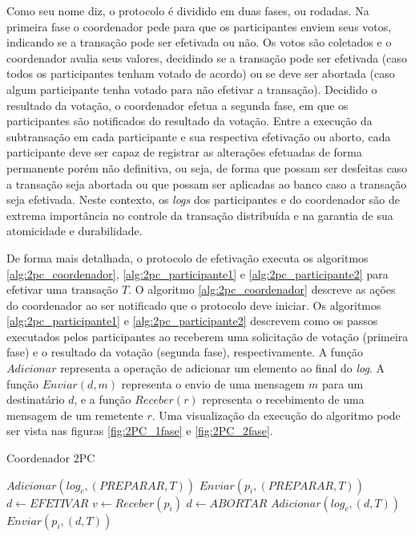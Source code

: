 \documentclass[11pt,twoside,a4paper]{book}
\begin{document}
Como seu nome diz, o protocolo é dividido em duas fases, ou rodadas. Na primeira fase o coordenador pede para que os participantes enviem seus votos, indicando se a transação pode ser efetivada ou não. Os votos são coletados e o coordenador avalia seus valores, decidindo se a transação pode ser efetivada (caso todos os participantes tenham votado de acordo) ou se deve ser abortada (caso algum participante tenha votado para não efetivar a transação). Decidido o resultado da votação, o coordenador efetua a segunda fase, em que os participantes são notificados do resultado da votação. Entre a execução da subtransação em cada participante e sua respectiva efetivação ou aborto, cada participante deve ser capaz de registrar as alterações efetuadas de forma permanente porém não definitiva, ou seja, de forma que possam ser desfeitas caso a transação seja abortada ou que possam ser aplicadas ao banco caso a transação seja efetivada. Neste contexto, os \emph{logs} dos participantes e do coordenador são de extrema importância no controle da transação distribuída e na garantia de sua atomicidade e durabilidade.

De forma mais detalhada, o protocolo de efetivação executa os algoritmos \ref{alg:2pc_coordenador}, \ref{alg:2pc_participante1} e \ref{alg:2pc_participante2} para efetivar uma transação $T$. O algoritmo \ref{alg:2pc_coordenador} descreve as ações do coordenador ao ser notificado que o protocolo deve iniciar. Os algoritmos \ref{alg:2pc_participante1} e \ref{alg:2pc_participante2} descrevem como os passos executados pelos participantes ao receberem uma solicitação de votação (primeira fase) e o resultado da votação (segunda fase), respectivamente. A função $Adicionar$ representa a operação de adicionar um elemento ao final do \emph{log}. A função $Enviar(d, m)$ representa o envio de uma mensagem $m$ para um destinatário $d$, e a função $Receber(r)$ representa o recebimento de uma mensagem de um remetente $r$. Uma visualização da execução do algoritmo pode ser vista nas figuras \ref{fig:2PC_1fase} e \ref{fig:2PC_2fase}.

\begin{algorithm}
\caption{Coordenador 2PC}
\label{alg:2pc_coordenador}
\begin{algorithmic}[1]
\State $Adicionar(log_c, (PREPARAR, T))$
	\State $Enviar(p_i, (PREPARAR, T))$
\EndFor
\State $d \gets EFETIVAR$
	\State $v \gets Receber(p_i)$
		\State $d \gets ABORTAR$
	\EndIf
\EndFor
\State $Adicionar(log_c, (d, T))$
	\State $Enviar(p_i, (d, T))$
\EndFor
\end{algorithmic}
\end{algorithm}
\end{document}
